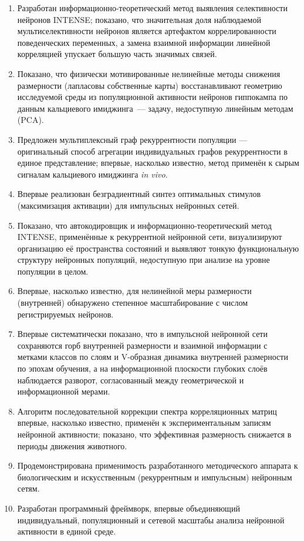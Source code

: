 {\novelty}
\begin{enumerate}[beginpenalty=10000] %
  \item Разработан информационно-теоретический метод выявления селективности
  нейронов INTENSE; показано, что значительная доля наблюдаемой
  мультиселективности нейронов является артефактом коррелированности
  поведенческих переменных, а замена взаимной информации линейной корреляцией
  упускает большую часть значимых связей.
  \item Показано, что физически мотивированные нелинейные методы снижения
  размерности (лапласовы собственные карты) восстанавливают геометрию
  исследуемой среды из популяционной активности нейронов гиппокампа по данным
  кальциевого имиджинга~--- задачу, недоступную линейным методам (PCA).
  \item Предложен мультиплексный граф рекуррентности популяции --- оригинальный
  способ агрегации индивидуальных графов рекуррентности в единое представление;
  впервые, насколько известно, метод применён к сырым сигналам кальциевого
  имиджинга \textit{in vivo}.
  \item Впервые реализован безградиентный синтез оптимальных стимулов
  (максимизация активации) для импульсных нейронных сетей.
  \item Показано, что автокодировщик и информационно-теоретический метод INTENSE,
  применённые к рекуррентной нейронной сети, визуализируют организацию её
  пространства состояний и выявляют тонкую функциональную структуру нейронных
  популяций, недоступную при анализе на уровне популяции в целом.
  \item Впервые, насколько известно, для нелинейной меры размерности
  (внутренней) обнаружено степенное масштабирование с числом регистрируемых
  нейронов.
  \item Впервые систематически показано, что в импульсной нейронной сети
  сохраняются горб внутренней размерности и взаимной информации с метками
  классов по слоям и V-образная динамика внутренней размерности по эпохам
  обучения, а на информационной плоскости глубоких слоёв наблюдается разворот,
  согласованный между геометрической и информационной мерами.
  \item Алгоритм последовательной коррекции спектра корреляционных матриц
  впервые, насколько известно, применён к экспериментальным записям нейронной
  активности; показано, что эффективная размерность снижается в периоды
  движения животного.
  \item Продемонстрирована применимость разработанного методического аппарата
  к биологическим и искусственным (рекуррентным и импульсным)
  нейронным сетям.
  \item Разработан программный фреймворк, впервые объединяющий индивидуальный,
  популяционный и сетевой масштабы анализа нейронной активности в единой среде.
\end{enumerate}

